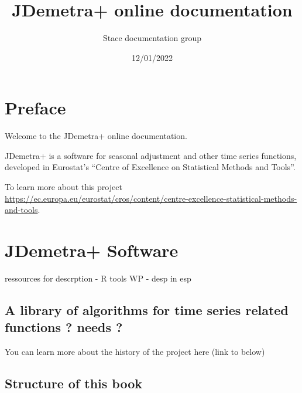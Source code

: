 \documentclass[
  letterpaper,
  DIV=11,
  numbers=noendperiod]{scrreprt}
\title{JDemetra+ online documentation}
\author{Stace documentation group}
\date{12/01/2022}
\renewcommand*\contentsname{Table of contents}
\newcommand\contentsname{Table of contents}
\begin{document}
\maketitle
\ifdefined\Shaded\renewenvironment{Shaded}{\begin{tcolorbox}[interior hidden, frame hidden, breakable, boxrule=0pt, borderline west={3pt}{0pt}{shadecolor}, enhanced, sharp corners]}{\end{tcolorbox}}\fi

\renewcommand*\contentsname{Table of contents}
{
\hypersetup{linkcolor=}
\setcounter{tocdepth}{2}
\tableofcontents
}
\hypertarget{preface}{%
\chapter*{Preface}\label{preface}}

Welcome to the JDemetra+ online documentation.

JDemetra+ is a software for seasonal adjustment and other time series
functions, developed in Eurostat's ``Centre of Excellence on Statistical
Methods and Tools''.

To learn more about this project
\url{https://ec.europa.eu/eurostat/cros/content/centre-excellence-statistical-methods-and-tools}.

\hypertarget{jdemetra-software}{%
\chapter{JDemetra+ Software}\label{jdemetra-software}}

ressources for descrption - R tools WP - desp in esp

\hypertarget{a-library-of-algorithms-for-time-series-related-functions-needs}{%
\section{A library of algorithms for time series related functions ?
needs
?}\label{a-library-of-algorithms-for-time-series-related-functions-needs}}

You can learn more about the history of the project here (link to below)

\hypertarget{structure-of-this-book}{%
\section{Structure of this book}\label{structure-of-this-book}}
\end{document}
